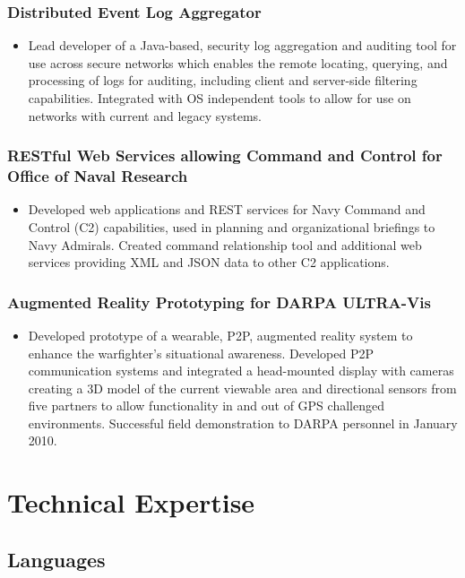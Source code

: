 \documentclass[11pt]{article}
\begin{document}
\subsubsection*{Distributed Event Log Aggregator}
\label{sec-1-5-2}

\begin{itemize}
\item Lead developer of a Java-based, security log aggregation and auditing tool for use across secure networks which enables the remote locating, querying, and processing of logs for auditing, including client and server-side filtering capabilities. Integrated with OS independent tools to allow for use on networks with current and legacy systems.
\end{itemize}
\subsubsection*{RESTful Web Services allowing Command and Control for Office of Naval Research}
\label{sec-1-5-3}

\begin{itemize}
\item Developed web applications and REST services for Navy Command and Control (C2) capabilities, used in planning and organizational briefings to Navy Admirals. Created command relationship tool and additional web services providing XML and JSON data to other C2 applications.
\end{itemize}
\subsubsection*{Augmented Reality Prototyping for DARPA ULTRA-Vis}
\label{sec-1-5-4}

\begin{itemize}
\item Developed prototype of a wearable, P2P, augmented reality system to enhance the warfighter's situational awareness. Developed P2P communication systems and integrated a head-mounted display with cameras creating a 3D model of the current viewable area and directional sensors from five partners to allow functionality in and out of GPS challenged environments. Successful field demonstration to DARPA personnel in January 2010.
\end{itemize}
\section*{Technical Expertise}
\label{sec-2}
\subsection*{Languages}
\label{sec-2-1}
\end{document}
